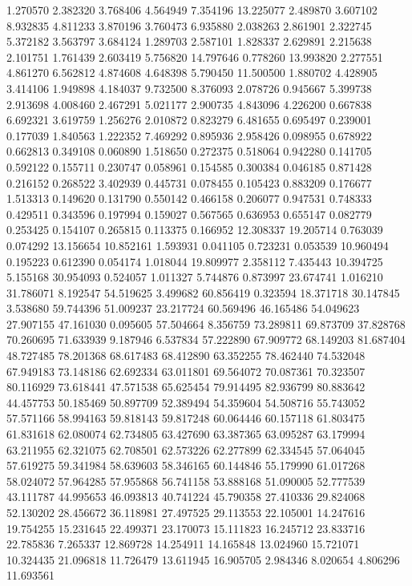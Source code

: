 1.270570
2.382320
3.768406
4.564949
7.354196
13.225077
2.489870
3.607102
8.932835
4.811233
3.870196
3.760473
6.935880
2.038263
2.861901
2.322745
5.372182
3.563797
3.684124
1.289703
2.587101
1.828337
2.629891
2.215638
2.101751
1.761439
2.603419
5.756820
14.797646
0.778260
13.993820
2.277551
4.861270
6.562812
4.874608
4.648398
5.790450
11.500500
1.880702
4.428905
3.414106
1.949898
4.184037
9.732500
8.376093
2.078726
0.945667
5.399738
2.913698
4.008460
2.467291
5.021177
2.900735
4.843096
4.226200
0.667838
6.692321
3.619759
1.256276
2.010872
0.823279
6.481655
0.695497
0.239001
0.177039
1.840563
1.222352
7.469292
0.895936
2.958426
0.098955
0.678922
0.662813
0.349108
0.060890
1.518650
0.272375
0.518064
0.942280
0.141705
0.592122
0.155711
0.230747
0.058961
0.154585
0.300384
0.046185
0.871428
0.216152
0.268522
3.402939
0.445731
0.078455
0.105423
0.883209
0.176677
1.513313
0.149620
0.131790
0.550142
0.466158
0.206077
0.947531
0.748333
0.429511
0.343596
0.197994
0.159027
0.567565
0.636953
0.655147
0.082779
0.253425
0.154107
0.265815
0.113375
0.166952
12.308337
19.205714
0.763039
0.074292
13.156654
10.852161
1.593931
0.041105
0.723231
0.053539
10.960494
0.195223
0.612390
0.054174
1.018044
19.809977
2.358112
7.435443
10.394725
5.155168
30.954093
0.524057
1.011327
5.744876
0.873997
23.674741
1.016210
31.786071
8.192547
54.519625
3.499682
60.856419
0.323594
18.371718
30.147845
3.538680
59.744396
51.009237
23.217724
60.569496
46.165486
54.049623
27.907155
47.161030
0.095605
57.504664
8.356759
73.289811
69.873709
37.828768
70.260695
71.633939
9.187946
6.537834
57.222890
67.909772
68.149203
81.687404
48.727485
78.201368
68.617483
68.412890
63.352255
78.462440
74.532048
67.949183
73.148186
62.692334
63.011801
69.564072
70.087361
70.323507
80.116929
73.618441
47.571538
65.625454
79.914495
82.936799
80.883642
44.457753
50.185469
50.897709
52.389494
54.359604
54.508716
55.743052
57.571166
58.994163
59.818143
59.817248
60.064446
60.157118
61.803475
61.831618
62.080074
62.734805
63.427690
63.387365
63.095287
63.179994
63.211955
62.321075
62.708501
62.573226
62.277899
62.334545
57.064045
57.619275
59.341984
58.639603
58.346165
60.144846
55.179990
61.017268
58.024072
57.964285
57.955868
56.741158
53.888168
51.090005
52.777539
43.111787
44.995653
46.093813
40.741224
45.790358
27.410336
29.824068
52.130202
28.456672
36.118981
27.497525
29.113553
22.105001
14.247616
19.754255
15.231645
22.499371
23.170073
15.111823
16.245712
23.833716
22.785836
7.265337
12.869728
14.254911
14.165848
13.024960
15.721071
10.324435
21.096818
11.726479
13.611945
16.905705
2.984346
8.020654
4.806296
11.693561
